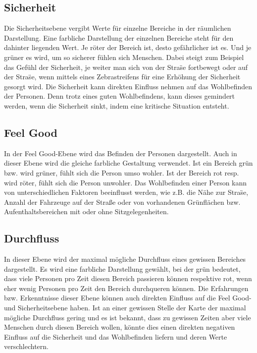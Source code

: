 \documentclass[10pt]{scrartcl}
\begin{document}
\subsection{Sicherheit}
Die Sicherheitsebene vergibt Werte f\"ur einzelne Bereiche in der r\"aumlichen Darstellung. Eine farbliche Darstellung der einzelnen Bereiche steht f\"ur den dahinter liegenden Wert. Je r\"oter der Bereich ist, desto gef\"ahrlicher ist es. Und je gr\"uner es wird, um so sicherer f\"uhlen sich Menschen. Dabei steigt zum Beispiel das Gef\"uhl der Sicherheit, je weiter man sich von der Stra\"se fortbewegt oder auf der Stra\"se, wenn mittels eines Zebrastreifens f\"ur eine Erh\"ohung der Sicherheit gesorgt wird.
\newline Die Sicherheit kann direkten Einfluss nehmen auf das Wohlbefinden der Personen. Denn trotz eines guten Wohlbefindens, kann dieses gemindert werden, wenn die Sicherheit sinkt, indem eine kritische Situation entsteht.

\subsection{Feel Good}
In der Feel Good-Ebene wird das Befinden der Personen dargestellt. Auch in dieser Ebene wird die gleiche farbliche Gestaltung verwendet. Ist ein Bereich gr\"un bzw. wird gr\"uner, f\"uhlt sich die Person umso wohler. Ist der Bereich rot resp. wird r\"oter, f\"uhlt sich die Person unwohler. Das Wohlbefinden einer Person kann von unterschiedlichen Faktoren beeinflusst werden, wie z.B. die N\"ahe zur Stra\"se, Anzahl der Fahrzeuge auf der Straße oder von vorhandenen Gr\"unfl\"achen bzw. Aufenthaltsbereichen mit oder ohne Sitzgelegenheiten.

\subsection{Durchfluss}
In dieser Ebene wird der maximal m\"ogliche Durchfluss eines gewissen Bereiches dargestellt. Es wird eine farbliche Darstellung gew\"ahlt, bei der gr\"un bedeutet, dass viele Personen pro Zeit diesen Bereich passieren k\"onnen respektive rot, wenn eher wenig Personen pro Zeit den Bereich durchqueren k\"onnen.
\newline Die Erfahrungen bzw. Erkenntnisse dieser Ebene k\"onnen auch direkten Einfluss auf die Feel Good- und Sicherheitsebene haben. Ist an einer gewissen Stelle der Karte der maximal m\"ogliche Durchfluss gering und es ist bekannt, dass zu gewissen Zeiten aber viele Menschen durch diesen Bereich wollen, k\"onnte dies einen direkten negativen Einfluss auf die Sicherheit und das Wohlbefinden liefern und deren Werte verschlechtern.
\end{document}

